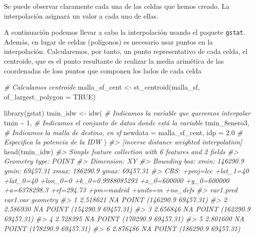 \documentclass[
]{report}
\newenvironment{Shaded}{\begin{snugshade}}{\end{snugshade}}
\newcommand{\AttributeTok}[1]{\textcolor[rgb]{0.77,0.63,0.00}{#1}}
\newcommand{\CommentTok}[1]{\textcolor[rgb]{0.56,0.35,0.01}{\textit{#1}}}
\newcommand{\ConstantTok}[1]{\textcolor[rgb]{0.00,0.00,0.00}{#1}}
\newcommand{\DecValTok}[1]{\textcolor[rgb]{0.00,0.00,0.81}{#1}}
\newcommand{\FloatTok}[1]{\textcolor[rgb]{0.00,0.00,0.81}{#1}}
\newcommand{\FunctionTok}[1]{\textcolor[rgb]{0.00,0.00,0.00}{#1}}
\newcommand{\NormalTok}[1]{#1}
\newcommand{\OtherTok}[1]{\textcolor[rgb]{0.56,0.35,0.01}{#1}}
\newcommand{\SpecialCharTok}[1]{\textcolor[rgb]{0.00,0.00,0.00}{#1}}
\theoremstyle{definition}
\theoremstyle{definition}
\theoremstyle{definition}
\theoremstyle{definition}
\theoremstyle{remark}
\begin{document}
Se puede observar claramente cada una de las celdas que hemos creado. La
interpolación asignará un valor a cada uno de ellas.

A continuación podemos llevar a cabo la interpolación usando el paquete \texttt{gstat}.
Además, en lugar de celdas (polígonos) es necesario usar puntos en la
interpolación. Calcularemos, por tanto, un punto representativo de cada celda,
el centroide, que es el punto resultante de realizar la media arimética de las
coordenadas de loss puntos que componen los lados de cada celda

\begin{Shaded}
\begin{Highlighting}[]
\CommentTok{\# Calculamos centroide}
\NormalTok{malla\_sf\_cent }\OtherTok{\textless{}{-}} \FunctionTok{st\_centroid}\NormalTok{(malla\_sf, }\AttributeTok{of\_largest\_polygon =} \ConstantTok{TRUE}\NormalTok{)}

\FunctionTok{library}\NormalTok{(gstat)}
\NormalTok{tmin\_idw }\OtherTok{\textless{}{-}} \FunctionTok{idw}\NormalTok{(}
  \CommentTok{\# Indicamos la variable que queremos interpolar}
\NormalTok{  tmin }\SpecialCharTok{\textasciitilde{}} \DecValTok{1}\NormalTok{,}
  \CommentTok{\# Indicamos el conjunto de datos donde está la variable}
\NormalTok{  tmin\_8enero3,}
  \CommentTok{\# Indicamos la malla de destino, en sf}
  \AttributeTok{newdata =}\NormalTok{ malla\_sf\_cent,}
  \AttributeTok{idp =} \FloatTok{2.0} \CommentTok{\# Especifica la potencia de la IDW}
\NormalTok{)}
\CommentTok{\#\textgreater{} [inverse distance weighted interpolation]}
\FunctionTok{head}\NormalTok{(tmin\_idw)}
\CommentTok{\#\textgreater{} Simple feature collection with 6 features and 2 fields}
\CommentTok{\#\textgreater{} Geometry type: POINT}
\CommentTok{\#\textgreater{} Dimension:     XY}
\CommentTok{\#\textgreater{} Bounding box:  xmin: 146290.9 ymin: 69457.31 xmax: 186290.9 ymax: 69457.31}
\CommentTok{\#\textgreater{} CRS:           +proj=lcc +lat\_1=40 +lat\_0=40 +lon\_0=0 +k\_0=0.9988085293 +x\_0=600000 +y\_0=600000 +a=6378298.3 +rf=294.73 +pm=madrid +units=m +no\_defs}
\CommentTok{\#\textgreater{}   var1.pred var1.var                  geometry}
\CommentTok{\#\textgreater{} 1  2.518621       NA POINT (146290.9 69457.31)}
\CommentTok{\#\textgreater{} 2  2.586930       NA POINT (154290.9 69457.31)}
\CommentTok{\#\textgreater{} 3  2.656846       NA POINT (162290.9 69457.31)}
\CommentTok{\#\textgreater{} 4  2.728395       NA POINT (170290.9 69457.31)}
\CommentTok{\#\textgreater{} 5  2.801600       NA POINT (178290.9 69457.31)}
\CommentTok{\#\textgreater{} 6  2.876486       NA POINT (186290.9 69457.31)}
\end{Highlighting}
\end{Shaded}
\end{document}
